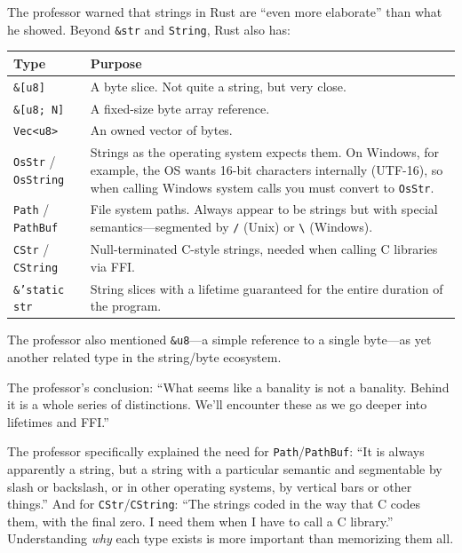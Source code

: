 The professor warned that strings in Rust are ``even more elaborate'' than what he showed. Beyond \texttt{\&str} and \texttt{String}, Rust also has:

\begin{center}
\begin{tabular}{|l|p{9cm}|}
\hline
\textbf{Type} & \textbf{Purpose} \\
\hline
\texttt{\&[u8]} & A byte slice. Not quite a string, but very close. \\
\texttt{\&[u8; N]} & A fixed-size byte array reference. \\
\texttt{Vec<u8>} & An owned vector of bytes. \\
\texttt{OsStr} / \texttt{OsString} & Strings as the operating system expects them. On Windows, for example, the OS wants 16-bit characters internally (UTF-16), so when calling Windows system calls you must convert to \texttt{OsStr}. \\
\texttt{Path} / \texttt{PathBuf} & File system paths. Always appear to be strings but with special semantics---segmented by \texttt{/} (Unix) or \texttt{\textbackslash} (Windows). \\
\texttt{CStr} / \texttt{CString} & Null-terminated C-style strings, needed when calling C libraries via FFI. \\
\texttt{\&'static str} & String slices with a lifetime guaranteed for the entire duration of the program. \\
\hline
\end{tabular}
\end{center}

The professor also mentioned \texttt{\&u8}---a simple reference to a single byte---as yet another related type in the string/byte ecosystem.

The professor's conclusion: ``What seems like a banality is not a banality. Behind it is a whole series of distinctions. We'll encounter these as we go deeper into lifetimes and FFI.''

\begin{insightbox}
The professor specifically explained the need for \texttt{Path}/\texttt{PathBuf}: ``It is always apparently a string, but a string with a particular semantic and segmentable by slash or backslash, or in other operating systems, by vertical bars or other things.'' And for \texttt{CStr}/\texttt{CString}: ``The strings coded in the way that C codes them, with the final zero. I need them when I have to call a C library.'' Understanding \emph{why} each type exists is more important than memorizing them all.
\end{insightbox}

